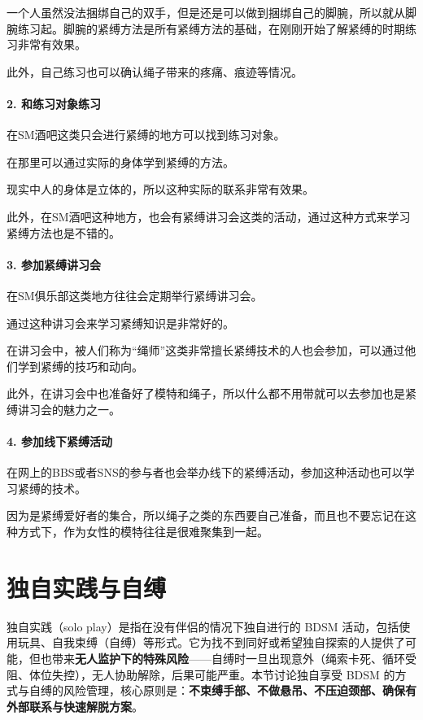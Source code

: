 \documentclass[12pt,UTF8]{ctexbook}
\begin{document}
一个人虽然没法捆绑自己的双手，但是还是可以做到捆绑自己的脚腕，所以就从脚腕练习起。脚腕的紧缚方法是所有紧缚方法的基础，在刚刚开始了解紧缚的时期练习非常有效果。

此外，自己练习也可以确认绳子带来的疼痛、痕迹等情况。

\paragraph{2. 和练习对象练习}

在SM酒吧这类只会进行紧缚的地方可以找到练习对象。

在那里可以通过实际的身体学到紧缚的方法。

现实中人的身体是立体的，所以这种实际的联系非常有效果。

此外，在SM酒吧这种地方，也会有紧缚讲习会这类的活动，通过这种方式来学习紧缚方法也是不错的。

\paragraph{3. 参加紧缚讲习会}

在SM俱乐部这类地方往往会定期举行紧缚讲习会。

通过这种讲习会来学习紧缚知识是非常好的。

在讲习会中，被人们称为“绳师”这类非常擅长紧缚技术的人也会参加，可以通过他们学到紧缚的技巧和动向。

此外，在讲习会中也准备好了模特和绳子，所以什么都不用带就可以去参加也是紧缚讲习会的魅力之一。

\paragraph{4. 参加线下紧缚活动}

在网上的BBS或者SNS的参与者也会举办线下的紧缚活动，参加这种活动也可以学习紧缚的技术。

因为是紧缚爱好者的集合，所以绳子之类的东西要自己准备，而且也不要忘记在这种方式下，作为女性的模特往往是很难聚集到一起。

\section{独自实践与自缚}

独自实践（solo play）是指在没有伴侣的情况下独自进行的 BDSM 活动，包括使用玩具、自我束缚（自缚）等形式。它为找不到同好或希望独自探索的人提供了可能，但也带来\textbf{无人监护下的特殊风险}——自缚时一旦出现意外（绳索卡死、循环受阻、体位失控），无人协助解除，后果可能严重。本节讨论独自享受 BDSM 的方式与自缚的风险管理，核心原则是：\textbf{不束缚手部、不做悬吊、不压迫颈部、确保有外部联系与快速解脱方案}。
\end{document}
